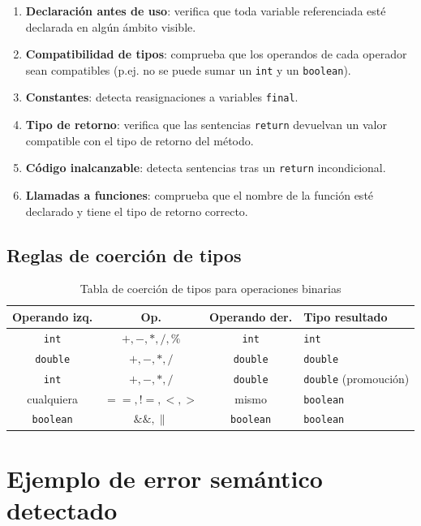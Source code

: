 \begin{enumerate}
  \item \textbf{Declaración antes de uso}: verifica que toda variable
    referenciada esté declarada en algún ámbito visible.
  \item \textbf{Compatibilidad de tipos}: comprueba que los operandos de
    cada operador sean compatibles (p.ej. no se puede sumar un \texttt{int}
    y un \texttt{boolean}).
  \item \textbf{Constantes}: detecta reasignaciones a variables \texttt{final}.
  \item \textbf{Tipo de retorno}: verifica que las sentencias \texttt{return}
    devuelvan un valor compatible con el tipo de retorno del método.
  \item \textbf{Código inalcanzable}: detecta sentencias tras un
    \texttt{return} incondicional.
  \item \textbf{Llamadas a funciones}: comprueba que el nombre de la función
    esté declarado y tiene el tipo de retorno correcto.
\end{enumerate}

\subsection{Reglas de coerción de tipos}

\begin{table}[H]
  \centering
  \caption{Tabla de coerción de tipos para operaciones binarias}
  \label{tab:coercion}
  \begin{tabular}{cccl}
    \toprule
    \textbf{Operando izq.} & \textbf{Op.} & \textbf{Operando der.} & \textbf{Tipo resultado} \\
    \midrule
    \texttt{int}    & $+,-,*,/,\%$  & \texttt{int}    & \texttt{int} \\
    \texttt{double} & $+,-,*,/$     & \texttt{double} & \texttt{double} \\
    \texttt{int}    & $+,-,*,/$     & \texttt{double} & \texttt{double} (promoución) \\
    cualquiera      & $==,!=,<,>$   & mismo           & \texttt{boolean} \\
    \texttt{boolean}& $\&\&, \|$    & \texttt{boolean}& \texttt{boolean} \\
    \bottomrule
  \end{tabular}
\end{table}

\section{Ejemplo de error semántico detectado}

